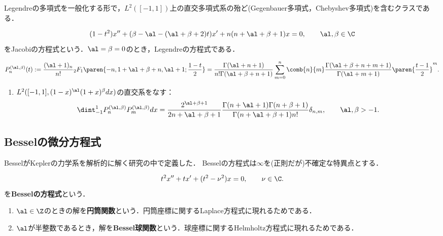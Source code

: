 \documentclass[uplatex,dvipdfmx]{jsreport}
\begin{document}
\begin{tcolorbox}[colframe=ForestGreen, colback=ForestGreen!10!white,breakable,colbacktitle=ForestGreen!40!white,coltitle=black,fonttitle=\bfseries\sffamily,
title=]
    Legendreの多項式を一般化する形で，$L^2([-1,1])$上の直交多項式系の殆ど(Gegenbauer多項式，Chebyshev多項式)を含むクラスである．
\end{tcolorbox}

\begin{problem}
    \[(1-t^2)x''+(\beta-\al-(\al+\beta+2)t)x'+n(n+\al+\beta+1)x=0,\qquad\al,\beta\in\C\]
    をJacobiの方程式という．$\al=\beta=0$のとき，Legendreの方程式である．
\end{problem}

\begin{definition}
    \[P_n^{(\al,\beta)}(t):=\frac{(\al+1)_n}{n!}{}_2F_1\paren{-n,1+\al+\beta+n,\al+1;\frac{1-t}{2}}=\frac{\Gamma(\al+n+1)}{n!\Gamma(\al+\beta+n+1)}\sum_{m=0}^n\comb{n}{m}\frac{\Gamma(\al+\beta+n+m+1)}{\Gamma(\al+m+1)}\paren{\frac{t-1}{2}}^m.\]
\end{definition}

\begin{proposition}
    \begin{enumerate}
        \item $L^2([-1,1],(1-x)^\al(1+x)^\beta dx)$の直交系をなす：
        \[\dint^1_{-1}P_n^{(\al,\beta)}P_m^{(\al,\beta)}dx=\frac{2^{\al+\beta+1}}{2n+\al+\beta+1}\frac{\Gamma(n+\al+1)\Gamma(n+\beta+1)}{\Gamma(n+\al+\beta+1)n!}\delta_{n,m},\qquad\al,\beta>-1.\]
    \end{enumerate}
\end{proposition}

\subsection{Besselの微分方程式}

\begin{tcolorbox}[colframe=ForestGreen, colback=ForestGreen!10!white,breakable,colbacktitle=ForestGreen!40!white,coltitle=black,fonttitle=\bfseries\sffamily,
title=]
    BesselがKeplerの力学系を解析的に解く研究の中で定義した．
    Besselの方程式は$\infty$を(正則だが)不確定な特異点とする．
\end{tcolorbox}

\begin{problem}\label{prob-Bessel-eq}
    \[t^2x''+tx'+(t^2-\nu^2)x=0,\qquad\nu\in\C.\]
    を\textbf{Besselの方程式}という．
    \begin{enumerate}
        \item $\al\in\Z$のときの解を\textbf{円筒関数}という．円筒座標に関するLaplace方程式に現れるためである．
        \item $\al$が半整数であるとき，解を\textbf{Bessel球関数}という．球座標に関するHelmholtz方程式に現れるためである．
    \end{enumerate}
\end{problem}
\end{document}
